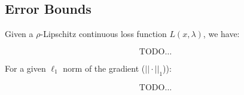 \documentclass[conference]{IEEEtran}
\begin{document}


\subsection{Error Bounds}

Given a $\rho$-Lipschitz continuous loss function $L(x,\lambda)$, we have:

$$
\mathrm{TODO}\dots
$$

For a given $\ell_1$ norm of the gradient ($||\cdot ||_1$)):

$$
\mathrm{TODO}\dots
$$
\end{document}

